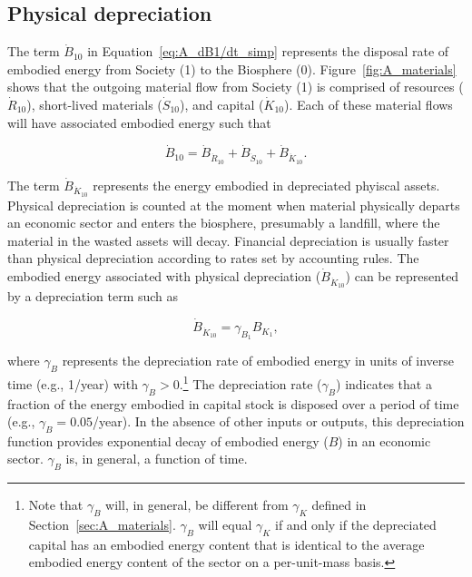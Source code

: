 \subsection{Physical depreciation}
\label{sec:depreciation_embodied}

The term $\dot{B}_{10}$ in Equation~\ref{eq:A_dB1/dt_simp}
represents the disposal rate 
of embodied energy from Society (1) to the Biosphere (0). 
Figure~\ref{fig:A_materials} shows that the outgoing material flow
from Society (1) is comprised of 
resources ($\dot{R}_{10}$),
short-lived materials ($\dot{S}_{10}$), and 
capital ($\dot{K}_{10}$). 
Each of these material flows will have associated embodied energy such that

\begin{equation} \label{eq:A-depreciation-of-B}
	\dot{B}_{10}
	= \dot{B}_{\dot{R}_{10}}
	+ \dot{B}_{\dot{S}_{10}}
	+ \dot{B}_{\dot{K}_{10}}.
\end{equation}

The term $\dot{B}_{\dot{K}_{10}}$ represents the energy embodied
in depreciated phyiscal assets.
Physical depreciation 
is counted at the moment when material physically departs an economic sector 
and enters the biosphere, presumably a landfill, 
where the material in the wasted assets will decay.
Financial depreciation
is usually faster than physical depreciation
according to rates set by accounting rules.
The embodied energy associated with physical depreciation ($\dot{B}_{\dot{K}_{10}}$)
can be represented by a depreciation term such as

\begin{equation} \label{eq:depreciation_term_defined}
	\dot{B}_{\dot{K}_{10}} 
	= \gamma_{B_{1}} B_{K_{1}},
\end{equation}

\noindent{}where $\gamma_{B}$ represents the depreciation rate 
of embodied energy in units of inverse time (e.g., 1/year) 
with $\gamma_{B} > 0$.\footnote{Note that $\gamma_B$ will, in general,
be different from $\gamma_{K}$ defined in Section~\ref{sec:A_materials}.
$\gamma_{B}$ will equal $\gamma_{K}$ if and only if 
the depreciated capital has an embodied energy content that is 
identical to the average embodied energy content 
of the sector on a per-unit-mass basis.}
The depreciation rate ($\gamma_{B}$) indicates that 
a fraction of the energy embodied in capital stock
is disposed over a period of time (e.g., $\gamma_{B} = 0.05$/year). 
In the absence of other inputs or outputs, 
this depreciation function provides exponential decay 
of embodied energy ($B$) in an economic sector. 
$\gamma_{B}$ is, in general, a function of time.

